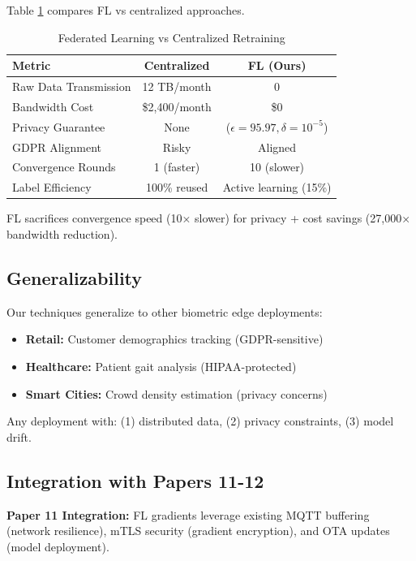 \documentclass[conference]{IEEEtran}
\begin{document}
Table \ref{tab:comparison} compares FL vs centralized approaches.

\begin{table}[h]
\caption{Federated Learning vs Centralized Retraining}
\begin{center}
\begin{tabular}{lcc}
\toprule
\textbf{Metric} & \textbf{Centralized} & \textbf{FL (Ours)} \\
\midrule
Raw Data Transmission & 12 TB/month & 0 \\
Bandwidth Cost & \$2,400/month & \$0 \\
Privacy Guarantee & None & ($\epsilon=95.97, \delta=10^{-5}$) \\
GDPR Alignment & Risky & Aligned \\
Convergence Rounds & 1 (faster) & 10 (slower) \\
Label Efficiency & 100\% reused & Active learning (15\%) \\
\bottomrule
\end{tabular}
\end{center}
\label{tab:comparison}
\end{table}

FL sacrifices convergence speed (10× slower) for privacy + cost savings (27,000× bandwidth reduction).

\subsection{Generalizability}

Our techniques generalize to other biometric edge deployments:
\begin{itemize}
    \item \textbf{Retail:} Customer demographics tracking (GDPR-sensitive)
    \item \textbf{Healthcare:} Patient gait analysis (HIPAA-protected)
    \item \textbf{Smart Cities:} Crowd density estimation (privacy concerns)
\end{itemize}

Any deployment with: (1) distributed data, (2) privacy constraints, (3) model drift.

\subsection{Integration with Papers 11-12}

\textbf{Paper 11 Integration:} FL gradients leverage existing MQTT buffering (network resilience), mTLS security (gradient encryption), and OTA updates (model deployment).
\end{document}
